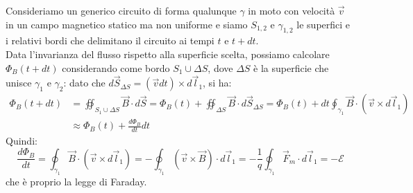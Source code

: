 \documentclass[]{article}
\newcommand{\E}{\mathcal{E}}
\begin{document}
Consideriamo un generico circuito di forma qualunque $ \gamma $ in moto con velocità $ \vec{v} $ in un campo magnetico statico ma non uniforme e siamo $ S_{1,2} $ e $ \gamma_{1,2} $ le superfici e i relativi bordi che delimitano il circuito ai tempi $ t $ e $ t + dt $. \\ 
%
Data l'invarianza del flusso rispetto alla superficie scelta, possiamo calcolare $ \Phi_B(t+dt) $ considerando come bordo $ S_1 \cup \Delta S $, dove $ \Delta S $ è la superficie che unisce $	\gamma_1 $ e $ \gamma_2 $: dato che $ d\vec{S}_{\Delta S} = (\vec{v}dt)\times d\vec{l}_1 $, si ha:
\begin{equation}
	\begin{split}
		\Phi_B(t+dt) &= \oiint_{S_1 \cup \Delta S} \vec{B}\cdot d\vec{S} = \Phi_B(t) + \oiint_{\Delta S} \vec{B}\cdot d\vec{S}_{\Delta S} = \Phi_B(t) + dt \oint_{\gamma_1} \vec{B}\cdot (\vec{v}\times d\vec{l}_1) \\ 
			     &\approx \Phi_B(t) + \frac{d\Phi_B}{dt} dt
	\end{split}
	\label{eq:8}
\end{equation}
Quindi:
\begin{equation}
	\frac{d\Phi_B}{dt} = \oint_{\gamma_1} \vec{B} \cdot (\vec{v}\times d\vec{l}_1) = - \oint_{\gamma_1} (\vec{v}\times\vec{B}) \cdot d\vec{l}_1 = -\frac{1}{q} \oint_{\gamma_1} \vec{F}_m \cdot d\vec{l}_1 = -\E
	\label{eq:9}
\end{equation}
che è proprio la legge di Faraday.
\end{document}
